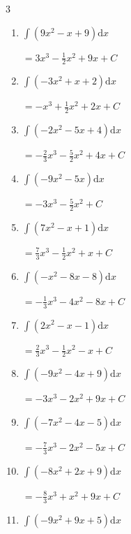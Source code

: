 \begin{multicols}{3}
\begin{enumerate}
  \item $\displaystyle \int \left( 9x^{2}-x+9 \right) \mathrm{d}x$

        $\displaystyle =3x^{3}-\frac{1}{2}x^{2}+9x+ C$

  \item $\displaystyle \int \left( -3x^{2}+x+2 \right) \mathrm{d}x$

        $\displaystyle =-x^{3}+\frac{1}{2}x^{2}+2x+ C$

  \item $\displaystyle \int \left( -2x^{2}-5x+4 \right) \mathrm{d}x$

        $\displaystyle =-\frac{2}{3}x^{3}-\frac{5}{2}x^{2}+4x+ C$

  \item $\displaystyle \int \left( -9x^{2}-5x \right) \mathrm{d}x$

        $\displaystyle =-3x^{3}-\frac{5}{2}x^{2}+ C$

  \item $\displaystyle \int \left( 7x^{2}-x+1 \right) \mathrm{d}x$

        $\displaystyle =\frac{7}{3}x^{3}-\frac{1}{2}x^{2}+x+ C$

\columnbreak %

\resetques

  \item $\displaystyle \int \left( -x^{2}-8x-8 \right) \mathrm{d}x$

        $\displaystyle =-\frac{1}{3}x^{3}-4x^{2}-8x+ C$

  \item $\displaystyle \int \left( 2x^{2}-x-1 \right) \mathrm{d}x$

        $\displaystyle =\frac{2}{3}x^{3}-\frac{1}{2}x^{2}-x+ C$

  \item $\displaystyle \int \left( -9x^{2}-4x+9 \right) \mathrm{d}x$

        $\displaystyle =-3x^{3}-2x^{2}+9x+ C$

  \item $\displaystyle \int \left( -7x^{2}-4x-5 \right) \mathrm{d}x$

        $\displaystyle =-\frac{7}{3}x^{3}-2x^{2}-5x+ C$

  \item $\displaystyle \int \left( -8x^{2}+2x+9 \right) \mathrm{d}x$

        $\displaystyle =-\frac{8}{3}x^{3}+x^{2}+9x+ C$

  \item $\displaystyle \int \left( -9x^{2}+9x+5 \right) \mathrm{d}x$


\end{enumerate}
\end{multicols}
